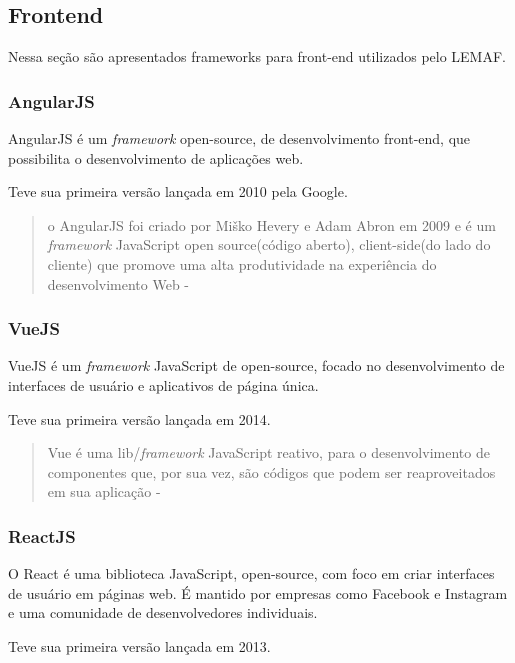\subsection{Frontend}

Nessa seção são apresentados frameworks para front-end utilizados pelo LEMAF.

\subsubsection{AngularJS}

AngularJS é um \textit{framework} open-source, de desenvolvimento front-end, que possibilita o desenvolvimento de aplicações web.

Teve sua primeira versão lançada em 2010 pela Google.

\begin{quote}
  o AngularJS foi criado por Miško Hevery e Adam Abron  em  2009  e  é  um  \textit{framework}  JavaScript open  source(código  aberto), client-side(do lado  do  cliente)  que  promove  uma  alta  produtividade  na  experiência  do  desenvolvimento Web - \cite{ferreira2018analise}
\end{quote}


\subsubsection{VueJS}

VueJS é um \textit{framework} JavaScript de open-source, focado no desenvolvimento de interfaces de usuário e aplicativos de página única.

Teve sua primeira versão lançada em 2014.

\begin{quote}
  Vue é uma lib/\textit{framework} JavaScript reativo, para  o  desenvolvimento  de  componentes  que,  por  sua  vez,  são  códigos  que  podem  ser reaproveitados em sua aplicação - \cite{ferreira2018analise}
\end{quote}


\subsubsection{ReactJS}

O React é uma biblioteca JavaScript, open-source, com foco em criar interfaces de usuário em páginas web. É mantido por empresas como Facebook e Instagram e uma comunidade de desenvolvedores individuais. 

Teve sua primeira versão lançada em 2013.

